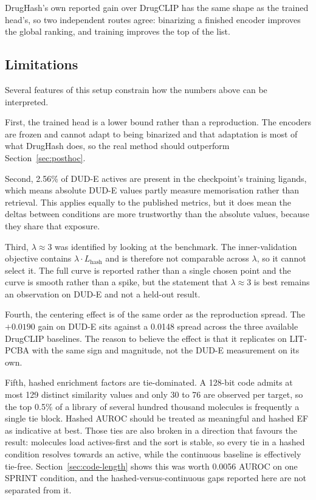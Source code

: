 \documentclass[10pt,a4paper]{article}
\begin{document}
DrugHash's own reported gain over DrugCLIP has the same shape as the trained head's, so two
independent routes agree: binarizing a finished encoder improves the global ranking, and
training improves the top of the list.

\subsection{Limitations}\label{sec:limitations}

Several features of this setup constrain how the numbers above can be interpreted.

First, the trained head is a lower bound rather than a reproduction. The encoders are frozen 
and cannot adapt to being binarized and that adaptation is most of what DrugHash does, so the 
real method should outperform Section~\ref{sec:posthoc}.

Second, 2.56\% of DUD-E actives are present in the checkpoint's training ligands, which means 
absolute DUD-E values partly measure memorisation rather than retrieval. This applies equally 
to the published metrics, but it does mean the deltas between conditions are more trustworthy
than the absolute values, because they share that exposure.

Third, $\lambda \approx 3$ was identified by looking at the benchmark. The inner-validation 
objective contains $\lambda \cdot L_{\text{hash}}$ and is therefore not comparable across $\lambda$, 
so it cannot select it. The full curve is reported rather than a single chosen point and the 
curve is smooth rather than a spike, but the statement that $\lambda \approx 3$ is best remains 
an observation on DUD-E and not a held-out result.

Fourth, the centering effect is of the same order as the reproduction spread. The $+0.0190$ 
gain on DUD-E sits against a 0.0148 spread across the three available DrugCLIP baselines. The 
reason to believe the effect is that it replicates on LIT-PCBA with the same sign and magnitude, 
not the DUD-E measurement on its own.

Fifth, hashed enrichment factors are tie-dominated. A 128-bit code admits at most 129 distinct
similarity values and only 30 to 76 are observed per target, so the top 0.5\% of a library of 
several hundred thousand molecules is frequently a single tie block. Hashed AUROC should be treated 
as meaningful and hashed EF as indicative at best. Those ties are also broken in a direction
that favours the result: molecules load actives-first and the sort is stable, so every tie in a
hashed condition resolves towards an active, while the continuous baseline is effectively
tie-free. Section~\ref{sec:code-length} shows this was worth 0.0056 AUROC on one SPRINT
condition, and the hashed-versus-continuous gaps reported here are not separated from it. 
\end{document}
